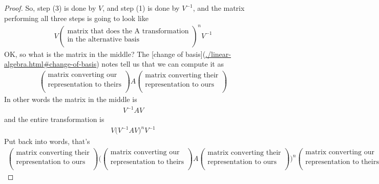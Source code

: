 \begin{proof}
So, step (3) is done by $V$, and step (1) is done by $V^{-1}$, and the matrix
performing all three steps is going to look like
\begin{align*}
  V
  \begin{pmatrix}\text{matrix that does the A transformation}\\\text{in the alternative basis} \\ \end{pmatrix}^n
  V^{-1}
\end{align*}
OK, so what is the matrix in the middle? The [change of
basis](\url{./linear-algebra.html#change-of-basis}) notes tell us that we can compute it as
\begin{align*}
  \begin{pmatrix}\text{matrix converting our}\\\text{representation to theirs} \\ \end{pmatrix}
  A
  \begin{pmatrix}\text{matrix converting their}\\\text{representation to ours} \\ \end{pmatrix}
\end{align*}
In other words the matrix in the middle is
\begin{align*}
  V^{-1}AV
\end{align*}
and the entire transformation is
\begin{align*}
  V
  \Big(V^{-1}AV\Big)^n
  V^{-1}
\end{align*}
Put back into words, that's
\begin{align*}
  \begin{pmatrix}\text{matrix converting their}\\\text{representation to ours} \\ \end{pmatrix}
  \Bigg(
  \begin{pmatrix}\text{matrix converting our}\\\text{representation to theirs} \\ \end{pmatrix}
  A
  \begin{pmatrix}\text{matrix converting their}\\\text{representation to ours} \\ \end{pmatrix}
  \Bigg)^n
  \begin{pmatrix}\text{matrix converting our}\\\text{representation to theirs} \\ \end{pmatrix}
\end{align*}


\end{proof}

